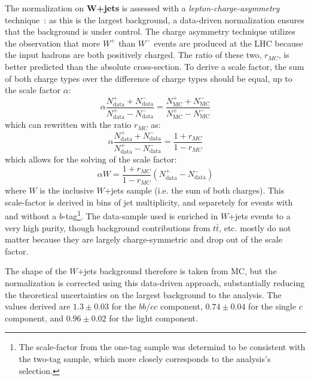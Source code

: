 The normalization on \textbf{$\mathbf{W}$+jets} is assessed with a \textit{lepton-charge-asymmetry} technique~\cite{wjetscharge}: as this is the largest background, a data-driven normalization ensures that the background is under control. The charge asymmetry technique utilizes the observation that more $W^+$ than $W^-$ events are produced at the LHC because the input hadrons are both positively charged. The ratio of these two, $r_{MC}$, is better predicted than the absolute cross-section. To derive a scale factor, the sum of both charge types over the difference of charge types should be equal, up to the scale factor $\alpha$:
%
\begin{equation}
\alpha \frac{N_\mathrm{data}^+ + N_\mathrm{data}^-}{N_\mathrm{data}^+ - N_\mathrm{data}^-} = \frac{N_\mathrm{MC}^+ + N_\mathrm{MC}^-}{N_\mathrm{MC}^+ - N_\mathrm{MC}^-}
\end{equation}
% 
which can rewritten with the ratio $r_{MC}$ as:
%
\begin{equation}
\alpha \frac{N_\mathrm{data}^+ + N_\mathrm{data}^-}{N_\mathrm{data}^+ - N_\mathrm{data}^-} = \frac{1 + r_{MC}}{1 - r_{MC}}
\end{equation}
%
which allows for the solving of the scale factor:
%
\begin{equation}
\alpha W = \frac{1 + r_{MC}}{1 - r_{MC}} \left( N_\mathrm{data}^+ - N_\mathrm{data}^- \right)
\end{equation}
%
where $W$ is the inclusive $W$+jets sample (i.e. the sum of both charges). This scale-factor is derived in bins of jet multiplicity, and separetely for events with and without a $b$-tag\footnote{The scale-factor from the one-tag sample was determind to be consistent with the two-tag sample, which more closely corresponds to the analysis's selection.}. The data-sample used is enriched in $W$+jets events to a very high purity, though background contributions from $t\bar{t}$, etc. mostly do not matter because they are largely charge-symmetric and drop out of the scale factor.

The shape of the $W$+jets background therefore is taken from MC, but the normalization is corrected using this data-driven approach, substantially reducing the theoretical uncertainties on the largest background to the analysis. The values derived are $1.3 \pm 0.03$ for the $bb/cc$ component, $0.74 \pm 0.04$ for the single $c$ component, and $0.96 \pm 0.02$ for the light component.


